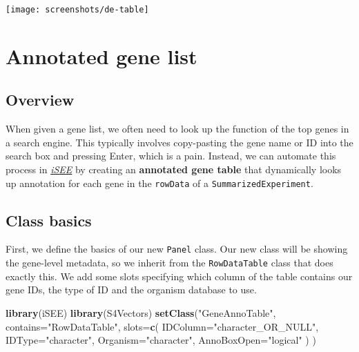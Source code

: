 \documentclass[
]{book}
\newenvironment{Shaded}{\begin{snugshade}}{\end{snugshade}}
\newcommand{\DataTypeTok}[1]{\textcolor[rgb]{0.13,0.29,0.53}{#1}}
\newcommand{\KeywordTok}[1]{\textcolor[rgb]{0.13,0.29,0.53}{\textbf{#1}}}
\newcommand{\NormalTok}[1]{#1}
\newcommand{\StringTok}[1]{\textcolor[rgb]{0.31,0.60,0.02}{#1}}
\begin{document}
\texttt{[image: screenshots/de-table]}

\hypertarget{annotated-gene-list}{%
\chapter{Annotated gene list}\label{annotated-gene-list}}

\hypertarget{overview}{%
\section{Overview}\label{overview}}

When given a gene list, we often need to look up the function of the top genes in a search engine.
This typically involves copy-pasting the gene name or ID into the search box and pressing Enter, which is a pain.
Instead, we can automate this process in \emph{\href{https://bioconductor.org/packages/3.11/iSEE}{iSEE}} by creating an \textbf{annotated gene table} that dynamically looks up annotation for each gene in the \texttt{rowData} of a \texttt{SummarizedExperiment}.

\hypertarget{class-basics}{%
\section{Class basics}\label{class-basics}}

First, we define the basics of our new \texttt{Panel} class.
Our new class will be showing the gene-level metadata, so we inherit from the \texttt{RowDataTable} class that does exactly this.
We add some slots specifying which column of the table contains our gene IDs, the type of ID and the organism database to use.

\begin{Shaded}
\begin{Highlighting}[]
\KeywordTok{library}\NormalTok{(iSEE)}
\KeywordTok{library}\NormalTok{(S4Vectors)}
\KeywordTok{setClass}\NormalTok{(}\StringTok{"GeneAnnoTable"}\NormalTok{, }\DataTypeTok{contains=}\StringTok{"RowDataTable"}\NormalTok{,}
    \DataTypeTok{slots=}\KeywordTok{c}\NormalTok{(}
        \DataTypeTok{IDColumn=}\StringTok{"character_OR_NULL"}\NormalTok{, }
        \DataTypeTok{IDType=}\StringTok{"character"}\NormalTok{,}
        \DataTypeTok{Organism=}\StringTok{"character"}\NormalTok{,}
        \DataTypeTok{AnnoBoxOpen=}\StringTok{"logical"}
\NormalTok{    )}
\NormalTok{)}
\end{Highlighting}
\end{Shaded}
\end{document}
